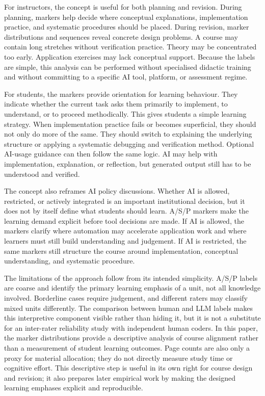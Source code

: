 \documentclass{article}
\begin{document}
For instructors, the concept is useful for both planning and revision. During planning, markers help decide where conceptual explanations, implementation practice, and systematic procedures should be placed. During revision, marker distributions and sequences reveal concrete design problems. A course may contain long stretches without verification practice. Theory may be concentrated too early. Application exercises may lack conceptual support. Because the labels are simple, this analysis can be performed without specialised didactic training and without committing to a specific AI tool, platform, or assessment regime.\par

For students, the markers provide orientation for learning behaviour. They indicate whether the current task asks them primarily to implement, to understand, or to proceed methodically. This gives students a simple learning strategy. When implementation practice fails or becomes superficial, they should not only do more of the same. They should switch to explaining the underlying structure or applying a systematic debugging and verification method. Optional AI-usage guidance can then follow the same logic. AI may help with implementation, explanation, or reflection, but generated output still has to be understood and verified.\par

The concept also reframes AI policy discussions. Whether AI is allowed, restricted, or actively integrated is an important institutional decision, but it does not by itself define what students should learn. A/S/P markers make the learning demand explicit before tool decisions are made. If AI is allowed, the markers clarify where automation may accelerate application work and where learners must still build understanding and judgement. If AI is restricted, the same markers still structure the course around implementation, conceptual understanding, and systematic procedure.\par

The limitations of the approach follow from its intended simplicity. A/S/P labels are coarse and identify the primary learning emphasis of a unit, not all knowledge involved. Borderline cases require judgement, and different raters may classify mixed units differently. The comparison between human and LLM labels makes this interpretive component visible rather than hiding it, but it is not a substitute for an inter-rater reliability study with independent human coders. In this paper, the marker distributions provide a descriptive analysis of course alignment rather than a measurement of student learning outcomes. Page counts are also only a proxy for material allocation; they do not directly measure study time or cognitive effort. This descriptive step is useful in its own right for course design and revision; it also prepares later empirical work by making the designed learning emphases explicit and reproducible.\par
\end{document}
